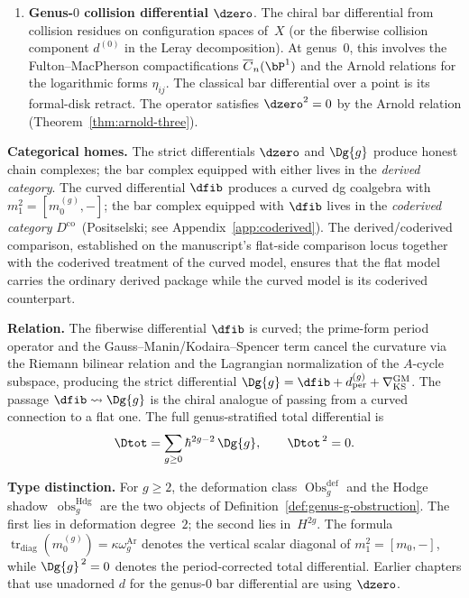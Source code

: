 \begin{convention}
\begin{enumerate}
\item[\textup{(iii)}] \textbf{Genus-$0$ collision differential} $\dzero$.
 The chiral bar differential from collision residues on configuration
 spaces of~$X$ (or the fiberwise collision component $d^{(0)}$ in
 the Leray decomposition). At genus~$0$, this involves the
 Fulton--MacPherson compactifications $\overline{C}_n(\bP^1)$ and
 the Arnold relations for the logarithmic forms $\eta_{ij}$.  The
 classical bar differential over a point is its formal-disk retract.
 The operator satisfies $\dzero^2 = 0$
 by the Arnold relation (Theorem~\ref{thm:arnold-three}).
\end{enumerate}

\noindent
\textbf{Categorical homes.}
The strict differentials $\dzero$ and $\Dg{g}$ produce honest
chain complexes; the bar complex equipped with either lives in
the \emph{derived category}. The curved differential $\dfib$
produces a curved dg coalgebra with
$m_1^2=[m_0^{(g)},-]$; the bar complex equipped with $\dfib$
lives in the \emph{coderived category}
$D^{\mathrm{co}}$~(Positselski;
see Appendix~\ref{app:coderived}).
The derived/coderived comparison, established on the manuscript's
flat-side comparison locus together with the coderived treatment of
the curved model, ensures that the flat model carries the ordinary
derived package while the curved model is its coderived counterpart.

\noindent
\textbf{Relation.}
The fiberwise differential $\dfib$ is curved; the prime-form
period operator and the Gauss--Manin/Kodaira--Spencer term cancel
the curvature via the Riemann bilinear relation and the Lagrangian
normalization of the $A$-cycle subspace, producing the strict
differential
$\Dg{g}=\dfib+d_{\mathrm{per}}^{(g)}
+\nabla_{\mathrm{KS}}^{\mathrm{GM}}$.
The passage $\dfib \leadsto \Dg{g}$ is the chiral analogue of
passing from a curved connection to a flat one. The full
genus-stratified total differential is
\[
 \Dtot = \sum_{g\ge 0} \hbar^{2g-2}\,\Dg{g}, \qquad
 \Dtot^{\,2} = 0.
\]

\noindent
\textbf{Type distinction.}
For $g\geq2$, the deformation class
$\operatorname{Obs}^{\mathrm{def}}_g$ and the
Hodge shadow~$\operatorname{obs}^{\mathrm{Hdg}}_g$ are the two
objects of Definition~\ref{def:genus-g-obstruction}.  The first lies
in deformation degree~$2$; the second lies in~$H^{2g}$.
The formula
$\operatorname{tr}_{\mathrm{diag}}(m_0^{(g)})
=\kappa\omega_g^{\mathrm{Ar}}$ denotes the vertical scalar diagonal
of $m_1^2=[m_0,-]$, while $\Dg{g}^{\,2}=0$ denotes the
period-corrected total differential. Earlier
chapters that use unadorned $d$ for the genus-$0$ bar differential are
using $\dzero$.
\end{convention}

